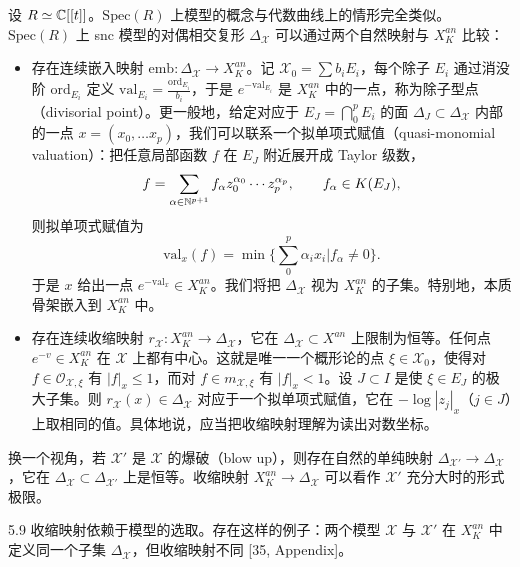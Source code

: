 设 $R\simeq\mathbb{C}[[t]]$。$\mathrm{Spec}(R)$ 上模型的概念与代数曲线上的情形完全类似。$\mathrm{Spec}(R)$ 上 snc 模型的对偶相交复形 $\Delta_{\mathcal X}$ 可以通过两个自然映射与 $X_K^{an}$ 比较：

\begin{itemize}
\item 存在连续嵌入映射 $\mathrm{emb}:\Delta_{\mathcal X}\to X_K^{an}$。记 $\mathcal X_0=\sum b_iE_i$，每个除子 $E_i$ 通过消没阶 $\mathrm{ord}_{E_i}$ 定义 $\mathrm{val}_{E_i}=\frac{\mathrm{ord}_{E_i}}{b_i}$，于是 $e^{-\mathrm{val}_{E_i}}$ 是 $X_K^{an}$ 中的一点，称为除子型点（divisorial point）。更一般地，给定对应于 $E_J=\bigcap_{0}^{p}E_i$ 的面 $\Delta_J\subset\Delta_{\mathcal X}$ 内部的一点 $x=(x_0,\dots x_p)$，我们可以联系一个拟单项式赋值（quasi-monomial valuation）：把任意局部函数 $f$ 在 $E_J$ 附近展开成 Taylor 级数，
\[
f=\sum_{\alpha\in\mathbb{N}^{p+1}}f_\alpha z_0^{\alpha_0}\cdots z_p^{\alpha_p},\qquad f_\alpha\in K(E_J),
\]
则拟单项式赋值为
\[
\mathrm{val}_x(f)=\min\Big\{\sum_{0}^{p}\alpha_ix_i\Big|f_\alpha\ne 0\Big\}.
\]
于是 $x$ 给出一点 $e^{-\mathrm{val}_x}\in X_K^{an}$。我们将把 $\Delta_{\mathcal X}$ 视为 $X_K^{an}$ 的子集。特别地，本质骨架嵌入到 $X_K^{an}$ 中。
\item 存在连续收缩映射 $r_{\mathcal X}:X_K^{an}\to\Delta_{\mathcal X}$，它在 $\Delta_{\mathcal X}\subset X^{an}$ 上限制为恒等。任何点 $e^{-v}\in X_K^{an}$ 在 $\mathcal X$ 上都有中心。这就是唯一一个概形论的点 $\xi\in\mathcal X_0$，使得对 $f\in\mathcal O_{\mathcal X,\xi}$ 有 $|f|_x\le 1$，而对 $f\in m_{\mathcal X,\xi}$ 有 $|f|_x<1$。设 $J\subset I$ 是使 $\xi\in E_J$ 的极大子集。则 $r_{\mathcal X}(x)\in\Delta_{\mathcal X}$ 对应于一个拟单项式赋值，它在 $-\log|z_j|_x$（$j\in J$）上取相同的值。具体地说，应当把收缩映射理解为读出对数坐标。
\end{itemize}

换一个视角，若 $\mathcal X'$ 是 $\mathcal X$ 的爆破（blow up），则存在自然的单纯映射 $\Delta_{\mathcal X'}\to\Delta_{\mathcal X}$，它在 $\Delta_{\mathcal X}\subset\Delta_{\mathcal X'}$ 上是恒等。收缩映射 $X_K^{an}\to\Delta_{\mathcal X}$ 可以看作 $\mathcal X'$ 充分大时的形式极限。


\begin{remark}{5.9}
收缩映射依赖于模型的选取。存在这样的例子：两个模型 $\mathcal X$ 与 $\mathcal X'$ 在 $X_K^{an}$ 中定义同一个子集 $\Delta_{\mathcal X}$，但收缩映射不同 [35, Appendix]。
\end{remark}

